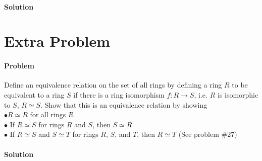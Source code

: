 \documentclass[a4paper,11pt]{article}
\begin{document}
\paragraph{Solution}

\section{Extra Problem}
\paragraph{Problem}
Define an equivalence relation on the set of all rings by defining a ring $R$ to be equivalent to a ring $S$ if there is a ring isomorphism $f: R \rightarrow S$, i.e. $R$ is isomorphic to $S$, $R \simeq S$. 
Show that this is an equivalence relation by showing\\
$\bullet R \simeq R$ for all rings $R$\\
$\bullet$ If $R \simeq S$ for rings $R$ and $S$, then $S \simeq R$\\
$\bullet$ If $R \simeq S$ and $S \simeq T$ for rings $R$, $S$, and $T$, then $R \simeq T$ (See problem \#27)

\paragraph{Solution}
\end{document}
